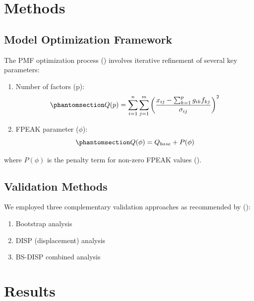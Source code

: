 \documentclass[
  letterpaper,
  oneside,
  openany]{MastersDoctoralThesis}
\providecommand{\tightlist}{%
  \setlength{\itemsep}{0pt}\setlength{\parskip}{0pt}}\usepackage{longtable,booktabs,array}
\theoremstyle{plain}
\theoremstyle{remark}
\begin{document}
\section{Methods}\label{methods}

\subsection{Model Optimization
Framework}\label{model-optimization-framework}

The PMF optimization process ()
involves iterative refinement of several key parameters:

\begin{enumerate}
\def\labelenumi{\arabic{enumi}.}
\item
  Number of factors (p):
  \begin{equation}\phantomsection\label{eq-pmf-opt}{Q(p) = \sum_{i=1}^{n} \sum_{j=1}^{m} \left(\frac{x_{ij} - \sum_{k=1}^{p} g_{ik}f_{kj}}{\sigma_{ij}}\right)^2}\end{equation}
\item
  FPEAK parameter (\(\phi\)):
  \begin{equation}\phantomsection\label{eq-pmf-fpeak}{Q(\phi) = Q_{base} + P(\phi)}\end{equation}
\end{enumerate}

where \(P(\phi)\) is the penalty term for non-zero FPEAK values
().

\subsection{Validation Methods}\label{validation-methods}

We employed three complementary validation approaches as recommended by
():

\begin{enumerate}
\def\labelenumi{\arabic{enumi}.}
\tightlist
\item
  Bootstrap analysis
\item
  DISP (displacement) analysis
\item
  BS-DISP combined analysis
\end{enumerate}

\section{Results}\label{results}
\end{document}
